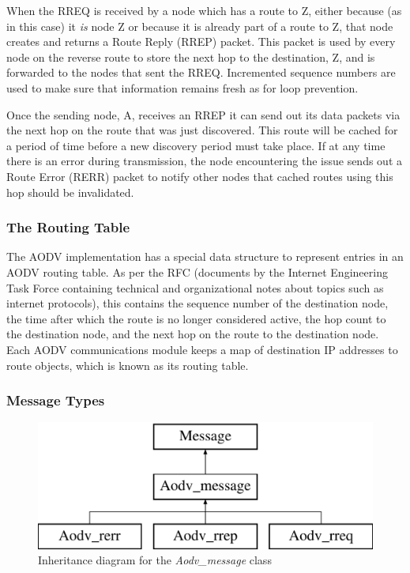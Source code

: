 When the RREQ is received by a node which has a route to Z, either because (as in this case) it \textit{is} node Z or because it is already part of a route to Z, that node creates and returns a Route Reply (RREP) packet. This packet is used by every node on the reverse route to store the next hop to the destination, Z, and is forwarded to the nodes that sent the RREQ. Incremented sequence numbers are used to make sure that information remains fresh as for loop prevention. 

Once the sending node, A, receives an RREP it can send out its data packets via the next hop on the route that was just discovered. This route will be cached for a period of time before a new discovery period must take place. If at any time there is an error during transmission, the node encountering the issue sends out a Route Error (RERR) packet to notify other nodes that cached routes using this hop should be invalidated.

\subsubsection{The Routing Table}
The AODV implementation has a special data structure to represent entries in an AODV routing table. As per the RFC (documents by the Internet Engineering Task Force containing technical and organizational notes about topics such as internet protocols), this contains the sequence number of the destination node, the time after which the route is no longer considered active, the hop count to the destination node, and the next hop on the route to the destination node. Each AODV communications module keeps a map of destination IP addresses to route objects, which is known as its routing table.

\subsubsection{Message Types}
\begin{figure}[H]
\centering	
\includegraphics[scale=0.4]{../documentation/latex/class_aodv__message}	
\caption{Inheritance diagram for the \textit{Aodv\_message} class}
\label{aodvmess}
\end{figure}

